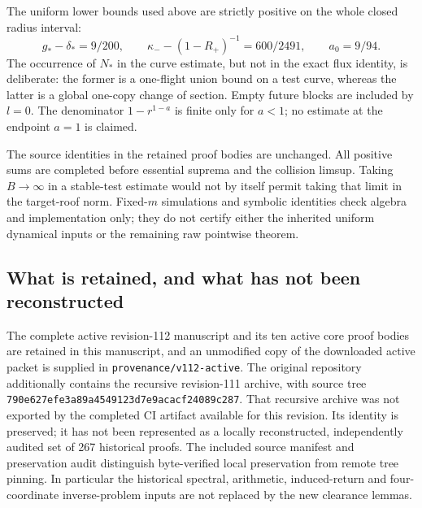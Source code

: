 The uniform lower bounds used above are strictly positive on the
whole closed radius interval:
\[
 g_*-\delta_*=9/200,\qquad
 \kappa_--(1-R_+)^{-1}=600/2491,\qquad
 a_0=9/94.
\]
The occurrence of $N_*$ in the curve estimate, but not in the exact
flux identity, is deliberate: the former is a one-flight union
bound on a test curve, whereas the latter is a global one-copy
change of section. Empty future blocks are included by $l=0$.
The denominator $1-r^{1-a}$ is finite only for $a<1$; no estimate
at the endpoint $a=1$ is claimed.

The source identities in the retained proof bodies are unchanged.
All positive sums are completed before essential suprema and the
collision limsup. Taking $B\to\infty$ in a stable-test estimate
would not by itself permit taking that limit in the target-roof
norm. Fixed-$m$ simulations and symbolic identities check algebra
and implementation only; they do not certify either the inherited
uniform dynamical inputs or the remaining raw pointwise theorem.

\subsection{What is retained, and what has not been reconstructed}
The complete active revision-112 manuscript and its ten active core
proof bodies are retained in this manuscript, and an unmodified
copy of the downloaded active packet is supplied in
\texttt{provenance/v112-active}. The original repository additionally
contains the recursive revision-111 archive, with source tree
\texttt{790e627efe3a89a4549123d7e9acacf24089c287}.
That recursive archive was not exported by the completed CI artifact
available for this revision. Its identity is preserved; it has not
been represented as a locally reconstructed, independently audited
set of 267 historical proofs. The included source manifest and
preservation audit distinguish byte-verified local preservation from
remote tree pinning. In particular the historical spectral,
arithmetic, induced-return and four-coordinate inverse-problem
inputs are not replaced by the new clearance lemmas.
